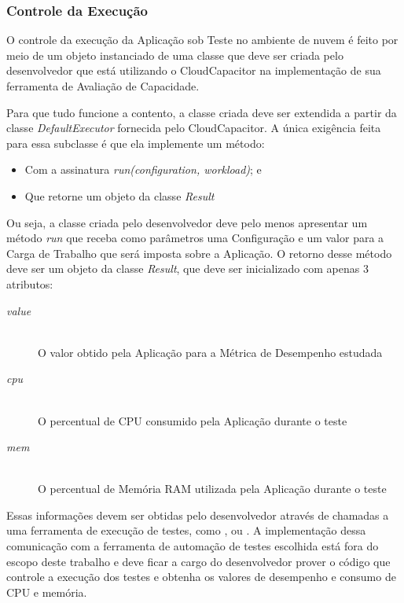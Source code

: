 \subsubsection{Controle da Execução}
\label{subsubsec:funcionamento_executor}
O controle da execução da Aplicação sob Teste no ambiente de nuvem é feito por 
meio de um objeto instanciado de uma classe que deve ser criada pelo
desenvolvedor que está utilizando o CloudCapacitor na implementação de sua 
ferramenta de Avaliação de Capacidade.

Para que tudo funcione a contento, a classe criada deve ser extendida a partir
da classe \emph{DefaultExecutor} fornecida pelo CloudCapacitor. A única 
exigência feita para essa subclasse é que ela implemente um método:

\begin{itemize}
  \item Com a assinatura \emph{run(configuration, workload)}; e
  \item Que retorne um objeto da classe \emph{Result}
\end{itemize}

Ou seja, a classe criada pelo desenvolvedor deve pelo menos apresentar um método
\emph{run} que receba como parâmetros uma Configuração e um valor para a Carga 
de Trabalho que será imposta sobre a Aplicação. O retorno desse método deve ser
um objeto da classe \emph{Result}, que deve ser inicializado com apenas 3 atributos:

\begin{description}
  \item[\emph{value}] \hfill \\
    O valor obtido pela Aplicação para a Métrica de Desempenho estudada
  \item[\emph{cpu}] \hfill \\
    O percentual de CPU consumido pela Aplicação durante o teste
  \item[\emph{mem}] \hfill \\
    O percentual de Memória RAM utilizada pela Aplicação durante o teste
\end{description}

Essas informações devem ser obtidas pelo desenvolvedor através de chamadas a
uma ferramenta de execução de testes, como \cite{cunha2012ambiente}, 
\cite{jayasinghe2012} ou \cite{silva2013cloudbench}. A implementação dessa 
comunicação com a ferramenta de automação de testes escolhida está 
fora do escopo deste trabalho e deve ficar a cargo do desenvolvedor prover o 
código que controle a execução dos testes e obtenha os valores de desempenho
e consumo de CPU e memória.

